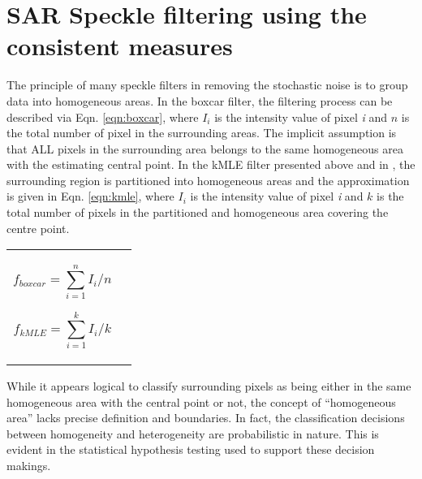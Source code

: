 \section{SAR Speckle filtering using the consistent measures}

The principle of many speckle filters in removing the stochastic noise is to group data into homogeneous areas.
In the boxcar filter, the filtering process can be described via Eqn. \ref{eqn:boxcar}, 
where 
	$I_i$ is the intensity value of pixel \textit{i} and
	$n$ is the total number of pixel in the surrounding areas.
The implicit assumption is that ALL pixels in the surrounding area belongs to the same homogeneous area with the estimating central point.
In the kMLE filter presented above and in \citep{Le_2010_ACRS}, the surrounding region is partitioned into homogeneous areas and the approximation is given in Eqn. \ref{eqn:kmle},
where 
	$I_i$ is the intensity value of pixel \textit{i} and
	$k$ is the total number of pixels in the partitioned and homogeneous area covering the centre point.

\begin{tabular}{c c}
\begin{minipage}[c]{0.45\textwidth}
\begin{equation}
\label{eqn:boxcar}
f_{boxcar} = \displaystyle{\sum_{i=1}^n{I_i}} / n 
\end{equation}
\end{minipage}
\begin{minipage}[c]{0.45\textwidth}
\begin{equation}
\label{eqn:kmle}
f_{kMLE }= \displaystyle{\sum_{i=1}^k{I_i} } / k 
\end{equation}
\end{minipage}
\end{tabular}

While it appears logical to classify surrounding pixels as being either in the same homogeneous area with the central point or not,
  the concept of ``homogeneous area'' lacks precise definition and boundaries.
In fact, the classification decisions between homogeneity and heterogeneity are probabilistic in nature.
This is evident in the statistical hypothesis testing used to support these decision makings.

